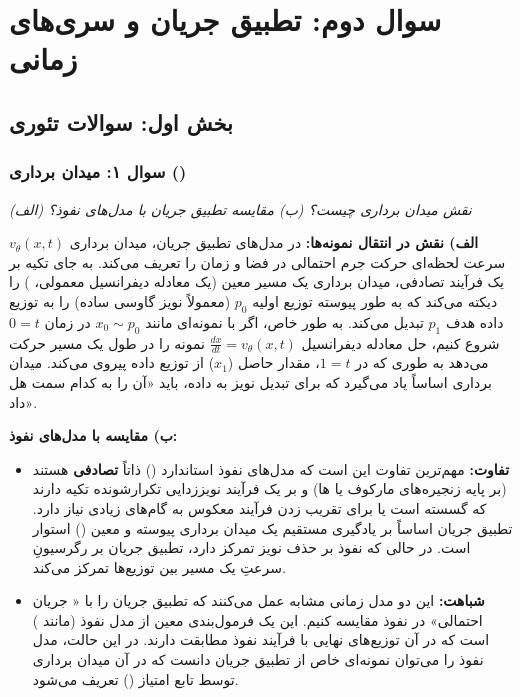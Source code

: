 \section{سوال دوم: تطبیق جریان و سری‌های زمانی}

\subsection{بخش اول: سوالات تئوری}

\subsubsection{سوال ۱: میدان برداری ()}
\textit{(الف) نقش میدان برداری چیست؟ (ب) مقایسه تطبیق جریان با مدل‌های نفوذ؟}

\begin{solutionbox}
    \textbf{الف) نقش در انتقال نمونه‌ها:}
    در مدل‌های تطبیق جریان، میدان برداری $v_\theta(x, t)$ سرعت لحظه‌ای حرکت جرم احتمالی در فضا و زمان را تعریف می‌کند. به جای تکیه بر یک فرآیند تصادفی، میدان برداری یک مسیر معین (یک معادله دیفرانسیل معمولی، ) را دیکته می‌کند که به طور پیوسته توزیع اولیه $p_0$ (معمولاً نویز گاوسی ساده) را به توزیع داده هدف $p_1$ تبدیل می‌کند. به طور خاص، اگر با نمونه‌ای مانند $x_0 \sim p_0$ در زمان $0=t$ شروع کنیم، حل معادله دیفرانسیل $\frac{dx}{dt} = v_\theta(x, t)$ نمونه را در طول یک مسیر حرکت می‌دهد به طوری که در $1=t$، مقدار حاصل ($x_1$) از توزیع داده پیروی می‌کند. میدان برداری اساساً یاد می‌گیرد که برای تبدیل نویز به داده، باید «آن را به کدام سمت هل داد».

    

    \textbf{ب) مقایسه با مدل‌های نفوذ:}
    \begin{itemize}
        \item \textbf{تفاوت:} مهم‌ترین تفاوت این است که مدل‌های نفوذ استاندارد () ذاتاً \textbf{تصادفی} هستند (بر پایه زنجیره‌های مارکوف یا ها) و بر یک فرآیند نویززدایی تکرار‌شونده تکیه دارند که گسسته است یا برای تقریب زدن فرآیند معکوس به گام‌های زیادی نیاز دارد. تطبیق جریان اساساً بر یادگیری مستقیم یک میدان برداری پیوسته و معین () استوار است. در حالی که نفوذ بر حذف نویز تمرکز دارد، تطبیق جریان بر رگرسیونِ سرعتِ یک مسیر بین توزیع‌ها تمرکز می‌کند.
        \item \textbf{شباهت:} این دو مدل زمانی مشابه عمل می‌کنند که تطبیق جریان را با « جریان احتمالی» در نفوذ مقایسه کنیم. این  یک فرمول‌بندی معین از مدل نفوذ (مانند ) است که در آن توزیع‌های نهایی با فرآیند نفوذ مطابقت دارند. در این حالت، مدل نفوذ را می‌توان نمونه‌ای خاص از تطبیق جریان دانست که در آن میدان برداری توسط تابع امتیاز () تعریف می‌شود.
    \end{itemize}
\end{solutionbox}

